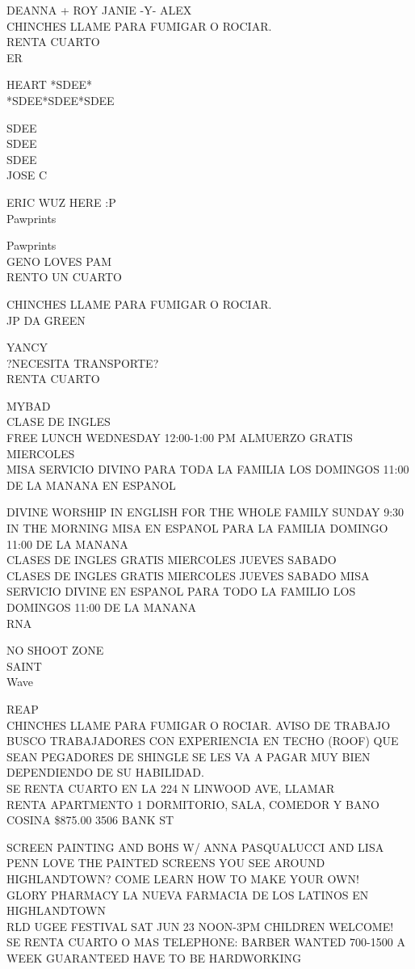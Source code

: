 \documentclass[10pt,letterpaper]{article}
\begin{document}
DEANNA + ROY JANIE {-}Y{-} ALEX\\
CHINCHES LLAME PARA FUMIGAR O ROCIAR.\\
RENTA CUARTO\\
ER

HEART *SDEE*\\
*SDEE*SDEE*SDEE

SDEE\\
SDEE\\
SDEE\\
JOSE C

ERIC WUZ HERE :P\\
Pawprints

Pawprints\\
GENO LOVES PAM\\
RENTO UN CUARTO

CHINCHES LLAME PARA FUMIGAR O ROCIAR.\\
JP DA GREEN

YANCY\\
?NECESITA TRANSPORTE?\\
RENTA CUARTO

MYBAD\\
CLASE DE INGLES\\
FREE LUNCH WEDNESDAY 12:00{-}1:00 PM ALMUERZO GRATIS MIERCOLES\\
MISA SERVICIO DIVINO PARA TODA LA FAMILIA LOS DOMINGOS 11:00 DE LA MANANA EN ESPANOL

DIVINE WORSHIP IN ENGLISH FOR THE WHOLE FAMILY SUNDAY 9:30 IN THE MORNING MISA EN ESPANOL PARA LA FAMILIA DOMINGO 11:00 DE LA MANANA\\
CLASES DE INGLES GRATIS MIERCOLES JUEVES SABADO\\
CLASES DE INGLES GRATIS MIERCOLES JUEVES SABADO MISA SERVICIO DIVINE EN ESPANOL PARA TODO LA FAMILIO LOS DOMINGOS 11:00 DE LA MANANA\\
RNA

NO SHOOT ZONE\\
SAINT\\
Wave

REAP\\
CHINCHES LLAME PARA FUMIGAR O ROCIAR. AVISO DE TRABAJO BUSCO TRABAJADORES CON EXPERIENCIA EN TECHO (ROOF) QUE SEAN PEGADORES DE SHINGLE SE LES VA A PAGAR MUY BIEN DEPENDIENDO DE SU HABILIDAD.\\
SE RENTA CUARTO EN LA 224 N LINWOOD AVE, LLAMAR\\
RENTA APARTMENTO 1 DORMITORIO, SALA, COMEDOR Y BANO COSINA \$875.00 3506 BANK ST

SCREEN PAINTING AND BOHS W/ ANNA PASQUALUCCI AND LISA PENN LOVE THE PAINTED SCREENS YOU SEE AROUND HIGHLANDTOWN?  COME LEARN HOW TO MAKE YOUR OWN!\\
GLORY PHARMACY LA NUEVA FARMACIA DE LOS LATINOS EN HIGHLANDTOWN\\
RLD UGEE FESTIVAL SAT JUN 23 NOON{-}3PM CHILDREN WELCOME!\\
SE RENTA CUARTO O MAS TELEPHONE: BARBER WANTED 700{-}1500 A WEEK GUARANTEED HAVE TO BE HARDWORKING
\end{document}
